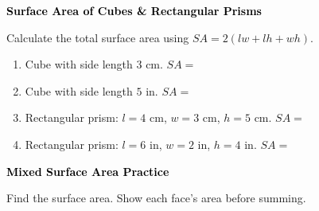 \documentclass[12pt, letterpaper, fleqn]{article}
\newcommand{\blank}{\underline{\hspace{2.2cm}}}
\begin{document}
\newpage

\begin{tcolorbox}[colback=black!10]
\large\textcolor{black}{\textbf{Surface Area of Cubes \& Rectangular Prisms}}
\end{tcolorbox}

\noindent
Calculate the total surface area using $SA = 2(lw + lh + wh)$.

\vspace{3mm}

\begin{enumerate}[itemsep=2.2cm, leftmargin=0.6cm]

\item Cube with side length $3\text{ cm}$. \quad $SA =$ \blank

\vspace{1.5cm}

\item Cube with side length $5\text{ in}$. \quad $SA =$ \blank

\vspace{1.5cm}

\item Rectangular prism: $l = 4\text{ cm}$, $w = 3\text{ cm}$, $h = 5\text{ cm}$. \quad $SA =$ \blank

\vspace{1.5cm}

\item Rectangular prism: $l = 6\text{ in}$, $w = 2\text{ in}$, $h = 4\text{ in}$. \quad $SA =$ \blank

\vspace{1.5cm}

\end{enumerate}

\newpage

\begin{tcolorbox}[colback=black!10]
\large\textcolor{black}{\textbf{Mixed Surface Area Practice}}
\end{tcolorbox}

\noindent
Find the surface area. Show each face's area before summing.

\vspace{3mm}
\end{document}
